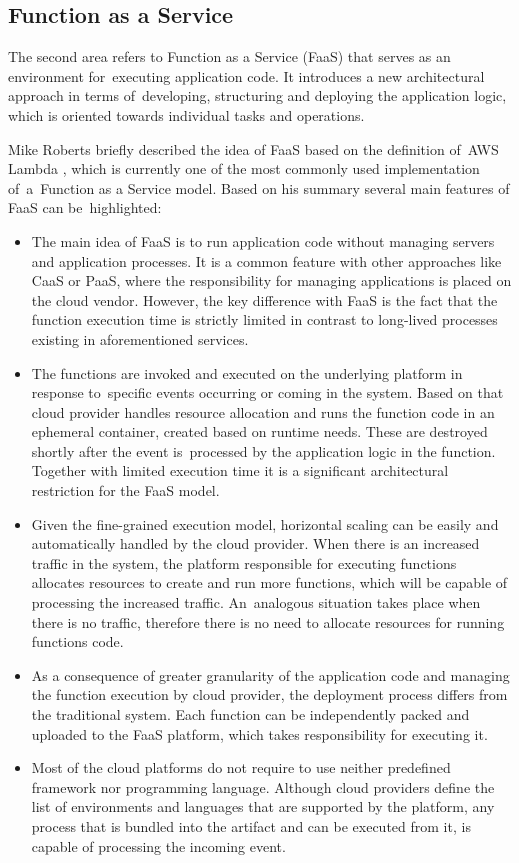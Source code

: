 \subsection{Function as a Service} \label{chapter:serverless-faas}

The second area refers to Function as a Service (FaaS) that serves as an environment for~executing application code. It introduces a new architectural approach in terms of~developing, structuring and deploying the application logic, which is oriented towards individual tasks and operations.

Mike Roberts briefly described the idea of FaaS \cite{MartinFowlerServerless} based on the definition of~AWS Lambda \cite{AWSLambda}, which is currently one of the most commonly used implementation of~a~Function as a Service model. Based on his summary several main features of FaaS can be~highlighted:

\begin{itemize}
    \item The main idea of FaaS is to run application code without managing servers and application processes. It is a common feature with other approaches like CaaS or PaaS, where the responsibility for managing applications is placed on the cloud vendor. However, the key difference with FaaS is the fact that the function execution time is strictly limited in contrast to long-lived processes existing in aforementioned services.
    \item The functions are invoked and executed on the underlying platform in response to~specific events occurring or coming in the system. Based on that cloud provider handles resource allocation and runs the function code in an ephemeral container, created based on runtime needs. These are destroyed shortly after the event is~processed by the application logic in the function. Together with limited execution time it is a significant architectural restriction for the FaaS model.
    \item Given the fine-grained execution model, horizontal scaling can be easily and automatically handled by the cloud provider. When there is an increased traffic in the system, the platform responsible for executing functions allocates resources to create and run more functions, which will be capable of processing the increased traffic. An~analogous situation takes place when there is no traffic, therefore there is no need to allocate resources for running functions code.
    \item As a consequence of greater granularity of the application code and managing the function execution by cloud provider, the deployment process differs from the traditional system. Each function can be independently packed and uploaded to the FaaS platform, which takes responsibility for executing it.
    \item Most of the cloud platforms do not require to use neither predefined framework nor programming language. Although cloud providers define the list of environments and languages that are supported by the platform, any process that is bundled into the artifact and can be executed from it, is capable of processing the incoming event.
\end{itemize}

